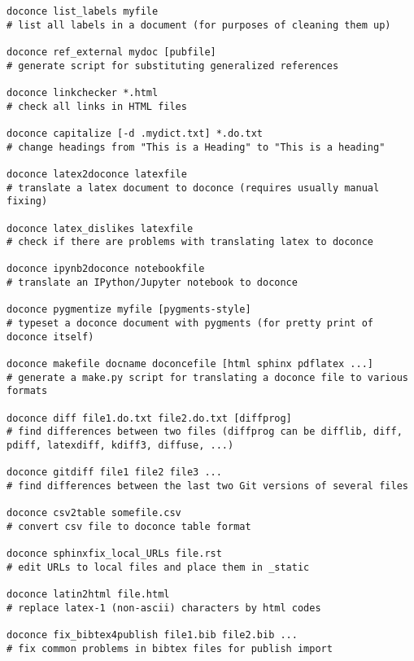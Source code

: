 \documentclass[%
oneside,                 %
final,                   %
10pt]{article}
\newcounter{doconce:movie:counter}
\begin{document}
\begin{Verbatim}[numbers=none,fontsize=\fontsize{9pt}{9pt},baselinestretch=0.95,xleftmargin=2mm]
doconce list_labels myfile                                             
# list all labels in a document (for purposes of cleaning them up)

doconce ref_external mydoc [pubfile]                                   
# generate script for substituting generalized references

doconce linkchecker *.html                                             
# check all links in HTML files

doconce capitalize [-d .mydict.txt] *.do.txt                           
# change headings from "This is a Heading" to "This is a heading"

doconce latex2doconce latexfile                                        
# translate a latex document to doconce (requires usually manual fixing)

doconce latex_dislikes latexfile                                       
# check if there are problems with translating latex to doconce

doconce ipynb2doconce notebookfile                                     
# translate an IPython/Jupyter notebook to doconce

doconce pygmentize myfile [pygments-style]                             
# typeset a doconce document with pygments (for pretty print of doconce itself)

doconce makefile docname doconcefile [html sphinx pdflatex ...]        
# generate a make.py script for translating a doconce file to various formats

doconce diff file1.do.txt file2.do.txt [diffprog]                      
# find differences between two files (diffprog can be difflib, diff, pdiff, latexdiff, kdiff3, diffuse, ...)

doconce gitdiff file1 file2 file3 ...                                  
# find differences between the last two Git versions of several files

doconce csv2table somefile.csv                                         
# convert csv file to doconce table format

doconce sphinxfix_local_URLs file.rst                                  
# edit URLs to local files and place them in _static

doconce latin2html file.html                                           
# replace latex-1 (non-ascii) characters by html codes

doconce fix_bibtex4publish file1.bib file2.bib ...                     
# fix common problems in bibtex files for publish import


\end{Verbatim}
\end{document}
